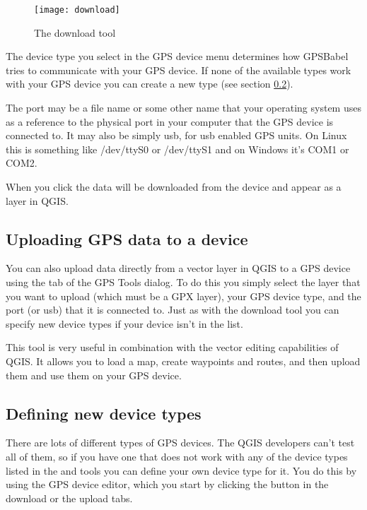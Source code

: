 \begin{figure}[ht]
   \centering
   \texttt{[image: download]}
   \caption{The download tool \nixcaption}\label{figure_download}
\end{figure}

The device type you select in the GPS device menu determines how GPSBabel tries to communicate with your GPS device.
If none of the available types work with your GPS device you can create a new type (see section \ref{sec:Defining-new-device}).

The port may be a file name or some other name that your operating system uses as a reference to the physical port in your computer that the GPS device is connected to. It may also be simply usb, for usb enabled GPS units.
\nix On Linux this is something like /dev/ttyS0 or /dev/ttyS1 and on \win Windows it's COM1 or COM2.

When you click  the data will be downloaded from the device and appear as a layer in QGIS.

\subsection{Uploading GPS data to a device}

You can also upload data directly from a vector layer in QGIS to a GPS device using the  tab of the GPS Tools dialog. To do this you simply select the layer that you want to upload (which must be a GPX layer),
your GPS device type, and the port (or usb) that it is connected to.
Just as with the download tool you can specify new device types if your device isn't in the list.

This tool is very useful in combination with the vector editing capabilities of QGIS. It allows you to load a map, create waypoints and routes, and then upload them and use them on your GPS device.

\subsection{Defining new device types}\label{sec:Defining-new-device}

There are lots of different types of GPS devices.
The QGIS developers can't test all of them, so if you have one that does not work with any of the device types listed in the  and  tools you can define your own device type for it.
You do this by using the GPS device editor, which you start by clicking the  button in the download or the upload tabs.

